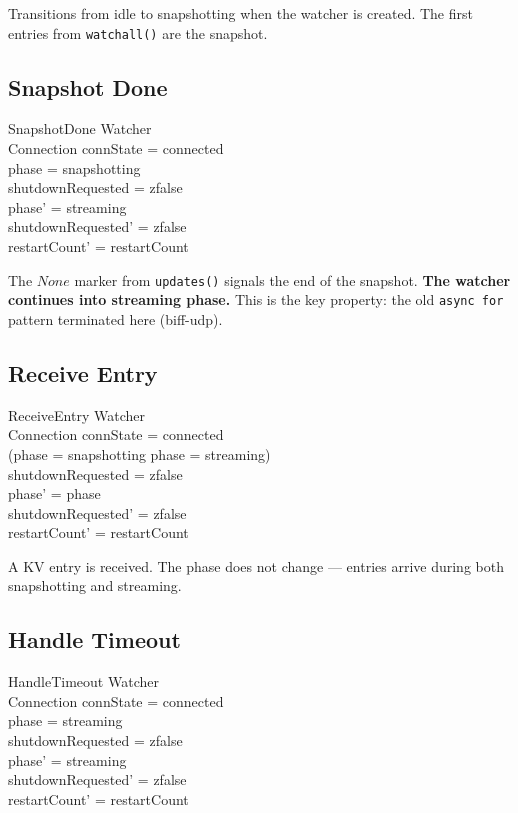 \documentclass[a4paper,10pt,fleqn]{article}
\begin{document}
Transitions from idle to snapshotting when the watcher is
created.  The first entries from \texttt{watchall()} are the
snapshot.

\subsection{Snapshot Done}

\begin{schema}{SnapshotDone}
  \Delta Watcher \\
  \Xi Connection
  \where
  connState = connected \\
  phase = snapshotting \\
  shutdownRequested = zfalse \\
  phase' = streaming \\
  shutdownRequested' = zfalse \\
  restartCount' = restartCount
\end{schema}

The $None$ marker from \texttt{updates()} signals the end of
the snapshot.  \textbf{The watcher continues into streaming
phase.}  This is the key property: the old \texttt{async~for}
pattern terminated here (biff-udp).

\subsection{Receive Entry}

\begin{schema}{ReceiveEntry}
  \Delta Watcher \\
  \Xi Connection
  \where
  connState = connected \\
  (phase = snapshotting \lor phase = streaming) \\
  shutdownRequested = zfalse \\
  phase' = phase \\
  shutdownRequested' = zfalse \\
  restartCount' = restartCount
\end{schema}

A KV entry is received.  The phase does not change --- entries
arrive during both snapshotting and streaming.

\subsection{Handle Timeout}

\begin{schema}{HandleTimeout}
  \Delta Watcher \\
  \Xi Connection
  \where
  connState = connected \\
  phase = streaming \\
  shutdownRequested = zfalse \\
  phase' = streaming \\
  shutdownRequested' = zfalse \\
  restartCount' = restartCount
\end{schema}
\end{document}
